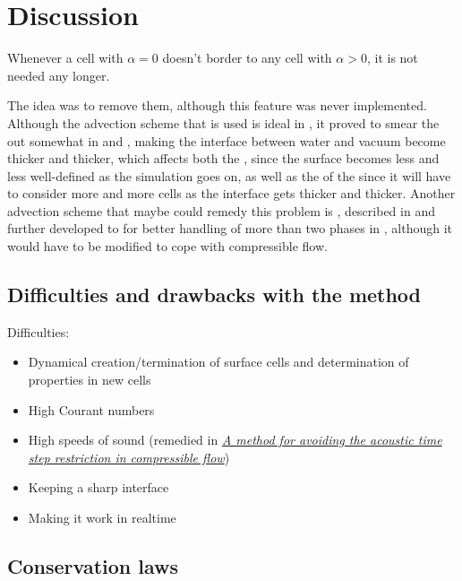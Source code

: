 \chapter{Discussion}

Whenever a cell with $\alpha = 0$ doesn't border to any cell with $\alpha > 0$, it is not needed any longer.

The idea was to remove them, although this feature was never implemented. Although the advection scheme that is used is ideal in , it proved to smear the  out somewhat in  and , making the interface between water and vacuum become thicker and thicker, which affects both the , since the surface becomes less and less well-defined as the simulation goes on, as well as the \preformance of the  since it will have to consider more and more cells as the interface gets thicker and thicker. Another advection scheme that maybe could remedy this problem is \MULES, described in \citep{Berberovi2009} and further developed to for better handling of more than two phases in \citep{Kissling2010}, although it would have to be modified to cope with compressible flow.

\section{Difficulties and drawbacks with the method}

Difficulties:
\begin{itemize}
    \item Dynamical creation/termination of surface cells and determination of properties in new cells
    \item High Courant numbers
    \item High speeds of sound (remedied in \textit{\href{http://physbam.stanford.edu/~kwatra/papers/compressible_semi_implicit/compressible_semi_implicit.pdf}{A method for avoiding the acoustic time step restriction in compressible flow}})
    \item Keeping a sharp interface
    \item Making it work in realtime
\end{itemize}

\section{Conservation laws}

